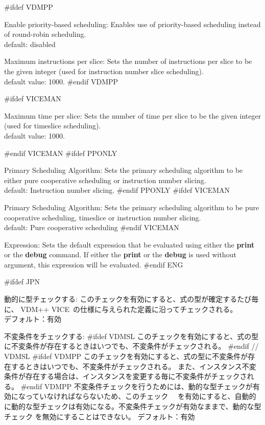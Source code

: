 \documentclass[\pformat,12pt]{article}
\newcommand{\vdmslpp}{VDM-SL}
\newcommand{\vdmslpp}{VDM++}
\renewcommand{\vdmslpp}{VDM++ VICE}
\newcommand{\guicmd}[1]{{\sf #1}}
\newcommand{\guicmd}[1]{{\gt #1}}
\begin{document}
\begin{list}{}{}
#ifdef VDMPP
\item[\textsf{Enable priority-based scheduling}:] Enables use of
  priority-based scheduling instead of round-robin scheduling.\\
  default: disabled
  
\item[\textsf{Maximum instructions per slice}:]
  Sets the number of instructions per slice to be the given
  integer (used for instruction number slice scheduling).\\
  default value: 1000.
#endif VDMPP

#ifdef VICEMAN
\item[\textsf{Maximum time per slice}:]
  Sets the number of time per slice to be the given
  integer (used for timeslice scheduling).\\
  default value: 1000.

#endif VICEMAN
#ifdef PPONLY
\item[\textsf{Primary Scheduling Algorithm}:]
  Sets the primary scheduling algorithm to be either
  pure cooperative scheduling or instruction number slicing.\\
  default: Instruction number slicing.
#endif PPONLY
#ifdef VICEMAN
\item[\textsf{Primary Scheduling Algorithm}:]
  Sets the primary scheduling algorithm to be
  pure cooperative scheduling, timeslice or instruction number slicing.\\
  default: Pure cooperative scheduling
#endif VICEMAN

\item[\textsf{Expression}:]
  Sets the default expression that be evaluated using
  either the \textbf{print} or the \textbf{debug} command.
  If either the \textbf{print} or the \textbf{debug} is used without argument,
  this expression will be evaluated.
#endif ENG

#ifdef JPN
\item[{\guicmd{動的に型チェックする}}:]
  このチェックを有効にすると、式の型が確定するたび毎に、
  \vdmslpp\ の仕様に与えられた定義に沿ってチェックされる。 \\
  デフォルト：有効

\item[{\guicmd{不変条件をチェックする}}:]
#ifdef VDMSL
  このチェックを有効にすると、式の型に不変条件が存在するときはいつでも、不変条件がチェックされる。
#endif // VDMSL
#ifdef VDMPP
  このチェックを有効にすると、式の型に不変条件が存在するときはいつでも、不変条件がチェックされる。
  また、インスタンス不変条件が存在する場合は、インスタンスを変更する毎に不変条件がチェックされる。
#endif VDMPP
  不変条件チェックを行うためには、動的な型チェックが有効になっていなければならないため、このチェック
　を有効にすると、自動的に動的な型チェックは有効になる。不変条件チェックが有効なままで、動的な型チェック
  を無効にすることはできない。
  デフォルト：有効
  

\end{list}
\end{document}
